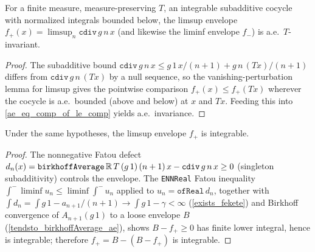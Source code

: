 \begin{lemma}\label{limsup_div_comp_ae}
  \leanok
  For a finite measure, measure-preserving \(T\), an integrable subadditive
  cocycle with normalized integrals bounded below, the limsup envelope
  \(f_+(x) = \limsup_n \texttt{cdiv}\,g\,n\,x\) (and likewise the liminf
  envelope \(f_-\)) is a.e.\ \(T\)-invariant.
\end{lemma}
\begin{proof}\leanok
  The subadditive bound \(\texttt{cdiv}\,g\,n\,x \le g\,1\,x/(n+1) + g\,n\,(Tx)/(n+1)\)
  differs from \(\texttt{cdiv}\,g\,n\,(Tx)\) by a null sequence, so the
  vanishing-perturbation lemma for limsup gives the pointwise comparison
  \(f_+(x) \le f_+(Tx)\) wherever the cocycle is a.e.\ bounded (above and
  below) at \(x\) and \(Tx\). Feeding this into
  \cref{ae_eq_comp_of_le_comp} yields a.e.\ invariance.
\end{proof}

\begin{lemma}\label{int_limsup_div_integrable}
  \leanok
  Under the same hypotheses, the limsup envelope \(f_+\) is integrable.
\end{lemma}
\begin{proof}\leanok
  The nonnegative Fatou defect \(d_n(x) = \texttt{birkhoffAverage}\,\mathbb{R}\,T\,(g\,1)\,
  (n+1)\,x - \texttt{cdiv}\,g\,n\,x \ge 0\) (singleton subadditivity) controls
  the envelope. The \texttt{ENNReal} Fatou inequality \(\int^- \liminf u_n \le
  \liminf \int^- u_n\) applied to \(u_n = \texttt{ofReal}\,d_n\), together with
  \(\int d_n = \int g\,1 - a_{n+1}/(n+1) \to \int g\,1 - \gamma < \infty\)
  (\cref{exists_fekete}) and Birkhoff convergence of \(A_{n+1}(g\,1)\) to a loose
  envelope \(B\) (\cref{tendsto_birkhoffAverage_ae}), shows \(B - f_+ \ge 0\) has
  finite lower integral, hence is integrable; therefore \(f_+ = B - (B - f_+)\)
  is integrable.
\end{proof}

